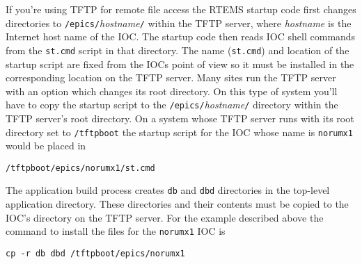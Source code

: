 \documentclass{report}
\begin{document}
If you're using TFTP for remote file access
the RTEMS startup code
first changes directories to {\tt /epics/}{\it hostname}{\tt /} within
the TFTP server, where {\it hostname} is the Internet host name of the IOC.
The startup code then reads IOC shell commands from the {\tt st.cmd} script
in that directory.
The name ({\tt st.cmd}) and location of the startup script are fixed from the IOCs point of
view so it must be installed in the corresponding location on the TFTP server.
Many sites run the TFTP server with an option which changes its root directory.
On this type of system you'll have to copy the startup script to the
{\tt /epics/}{\it hostname}{\tt /} directory within the TFTP server's root
directory.  On a system whose TFTP server runs with its root
directory set to {\tt /tftpboot} the startup script for the IOC
whose name is {\tt norumx1} would be placed in
\begin{verbatim}
/tftpboot/epics/norumx1/st.cmd
\end{verbatim}
The application build process creates {\tt db} and {\tt dbd} directories
in the top-level application directory.  These directories and their contents
must be copied to the IOC's directory on the TFTP server.  For the 
example described above the
command to install the files for the {\tt norumx1} IOC is
\begin{verbatim}
cp -r db dbd /tftpboot/epics/norumx1
\end{verbatim}
\end{document}
